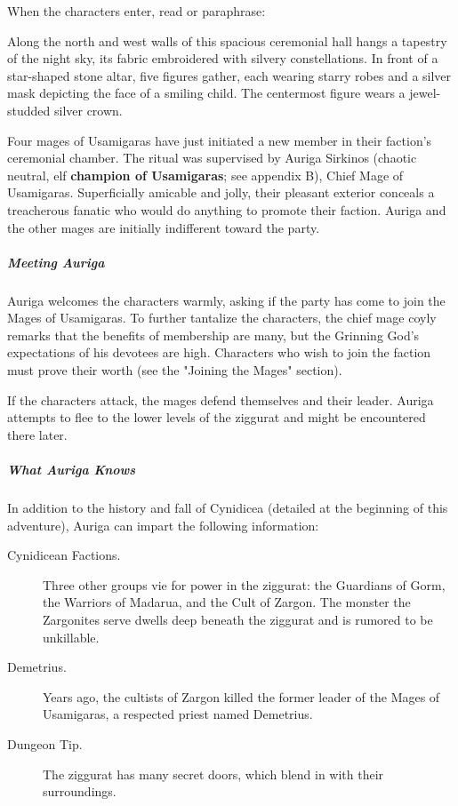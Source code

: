 \documentclass[10pt,a4paper,twoside,bg=print,twocolumn,openany,nodeprecatedcode]{dndbook}
\begin{document}
When the characters enter, read or paraphrase:

\begin{DndReadAloud}{}
Along the north and west walls of this spacious ceremonial hall hangs a tapestry of the night sky, its fabric embroidered with silvery constellations. In front of a star-shaped stone altar, five figures gather, each wearing starry robes and a silver mask depicting the face of a smiling child. The centermost figure wears a jewel-studded silver crown.

\end{DndReadAloud}

Four mages of Usamigaras have just initiated a new member in their faction's ceremonial chamber. The ritual was supervised by Auriga Sirkinos (chaotic neutral, elf \textbf{champion of Usamigaras}; see appendix B), Chief Mage of Usamigaras. Superficially amicable and jolly, their pleasant exterior conceals a treacherous fanatic who would do anything to promote their faction. Auriga and the other mages are initially indifferent toward the party.

\subparagraph{Meeting Auriga}
Auriga welcomes the characters warmly, asking if the party has come to join the Mages of Usamigaras. To further tantalize the characters, the chief mage coyly remarks that the benefits of membership are many, but the Grinning God's expectations of his devotees are high. Characters who wish to join the faction must prove their worth (see the "Joining the Mages" section).

If the characters attack, the mages defend themselves and their leader. Auriga attempts to flee to the lower levels of the ziggurat and might be encountered there later.

\subparagraph{What Auriga Knows}
In addition to the history and fall of Cynidicea (detailed at the beginning of this adventure), Auriga can impart the following information:


\begin{description}
\item[Cynidicean Factions.]
Three other groups vie for power in the ziggurat: the Guardians of Gorm, the Warriors of Madarua, and the Cult of Zargon. The monster the Zargonites serve dwells deep beneath the ziggurat and is rumored to be unkillable.
\end{description}


\begin{description}
\item[Demetrius.]
Years ago, the cultists of Zargon killed the former leader of the Mages of Usamigaras, a respected priest named Demetrius.
\item[Dungeon Tip.]
The ziggurat has many secret doors, which blend in with their surroundings.
\end{description}
\end{document}
